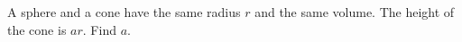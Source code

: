 A sphere and a cone have the same radius $r$ and the same volume. The height of the cone is $ar$. Find $a$.
